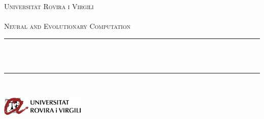 \begin{titlepage}
  	\newcommand{\HRule}{\rule{\linewidth}{0.3mm}}
	\center
	
	\textsc{\LARGE Universitat Rovira i Virgili}\\[1.5cm]
	
	\textsc{\Large \deliverableName}\\[0.5cm]
	
	\textsc{\large Neural and Evolutionary Computation}\\[0.5cm]
	
	
	\HRule\\[0.4cm]
	
	{\huge\bfseries \@title}\\[0.4cm]
	
	\HRule\\[1.5cm]
	

 	{\large\sc\@author}
	
	
	\vfill\vfill
    \vfill\vfill\vfill
	
	\vfill
	\includegraphics[width=0.3\textwidth]{./urvlogo.png}
	\vfill
\end{titlepage}
